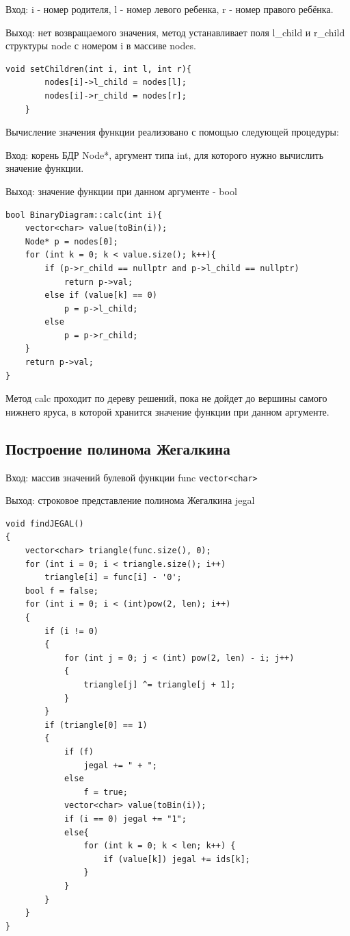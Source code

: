 \documentclass[a4paper]{article}
\theoremstyle{plain}
\theoremstyle{definition*}
\theoremstyle{remark}
\begin{document}
Вход: i - номер родителя, l - номер левого ребенка, r - номер правого
ребёнка. 


Выход: нет возвращаемого значения, метод устанавливает поля 
l\_child и r\_child структуры node с номером i в массиве nodes.

\begin{lstlisting}[]
    void setChildren(int i, int l, int r){
        nodes[i]->l_child = nodes[l];
        nodes[i]->r_child = nodes[r];
    }
\end{lstlisting}


Вычисление значения 
функции реализовано с помощью следующей процедуры: 


Вход: корень БДР Node*, аргумент типа int, для которого нужно вычислить 
значение функции. 


Выход: значение функции при данном аргументе - bool
\begin{lstlisting}
bool BinaryDiagram::calc(int i){
    vector<char> value(toBin(i));
    Node* p = nodes[0];
    for (int k = 0; k < value.size(); k++){
        if (p->r_child == nullptr and p->l_child == nullptr)
            return p->val;
        else if (value[k] == 0)
            p = p->l_child;
        else
            p = p->r_child;
    }
    return p->val;
}
\end{lstlisting}
Метод calc проходит по дереву решений, пока не дойдет до вершины 
самого нижнего яруса, в которой хранится значение функции при данном
аргументе. 

\subsection{Построение полинома Жегалкина}
Вход: массив значений булевой функции func \lstinline{vector<char>}


Выход: строковое представление полинома Жегалкина jegal
\begin{lstlisting}[]
void findJEGAL()
{
    vector<char> triangle(func.size(), 0);
    for (int i = 0; i < triangle.size(); i++)
        triangle[i] = func[i] - '0';
    bool f = false;
    for (int i = 0; i < (int)pow(2, len); i++)
    {
        if (i != 0) 
        {
            for (int j = 0; j < (int) pow(2, len) - i; j++) 
            {
                triangle[j] ^= triangle[j + 1];
            }
        }
        if (triangle[0] == 1)
        {
            if (f)
                jegal += " + ";
            else
                f = true;
            vector<char> value(toBin(i));
            if (i == 0) jegal += "1";
            else{
                for (int k = 0; k < len; k++) {
                    if (value[k]) jegal += ids[k];
                }
            }
        }
    }
} 
\end{lstlisting}
\end{document}
